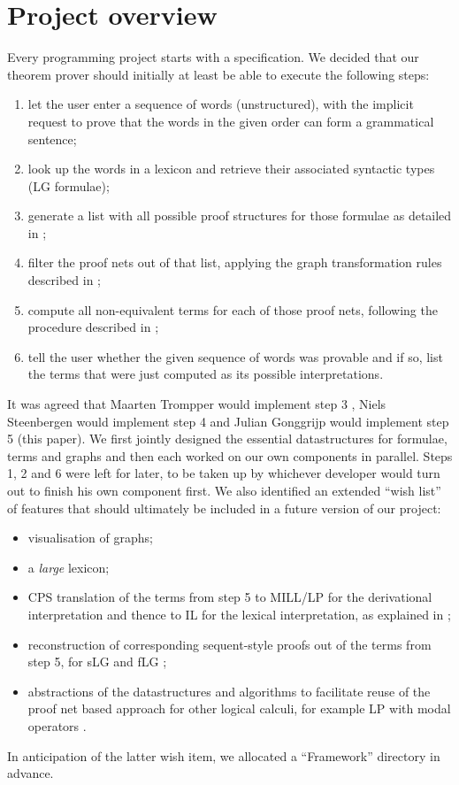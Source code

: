 \documentclass[12pt,a4paper]{article}
\begin{document}
\section{Project overview}\label{sec:project}

Every programming project starts with a specification. We decided that our theorem prover should initially at least be able to execute the following steps:
\begin{enumerate}
    \item let the user enter a sequence of words (unstructured), with the implicit request to prove that the words in the given order can form a grammatical sentence;
    \item look up the words in a lexicon and retrieve their associated syntactic types (LG formulae);
    \item generate a list with all possible proof structures for those formulae as detailed in \cite[p.~4--7]{mm12};
    \item filter the proof nets out of that list, applying the graph transformation rules described in \cite[p.~7--11]{mm12};
    \item compute all non-equivalent terms for each of those proof nets, following the procedure described in \cite[p.~21--26]{mm12};
    \item tell the user whether the given sequence of words was provable and if so, list the terms that were just computed as its possible interpretations.
\end{enumerate}
It was agreed that Maarten Trompper would implement step 3 \cite{maarten}, Niels Steenbergen would implement step 4 \cite{niels} and Julian Gonggrijp would implement step 5 (this paper). We first jointly designed the essential datastructures for formulae, terms and graphs and then each worked on our own components in parallel. Steps 1, 2 and 6 were left for later, to be taken up by whichever developer would turn out to finish his own component first. We also identified an extended ``wish list'' of features that should ultimately be included in a future version of our project:
\begin{itemize}
    \item visualisation of graphs;
    \item a \emph{large} lexicon;
    \item CPS translation of the terms from step 5 to MILL/LP for the derivational interpretation and thence to IL for the lexical interpretation, as explained in \cite[p.~14,19--21]{mm12};
    \item reconstruction of corresponding sequent-style proofs out of the terms from step 5, for sLG \cite[p.~3--4]{mm12} and fLG \cite[p.~15--18]{mm12};
    \item abstractions of the datastructures and algorithms to facilitate reuse of the proof net based approach for other logical calculi, for example LP with modal operators \cite{}.
\end{itemize}
In anticipation of the latter wish item, we allocated a ``Framework'' directory in advance.
\end{document}
